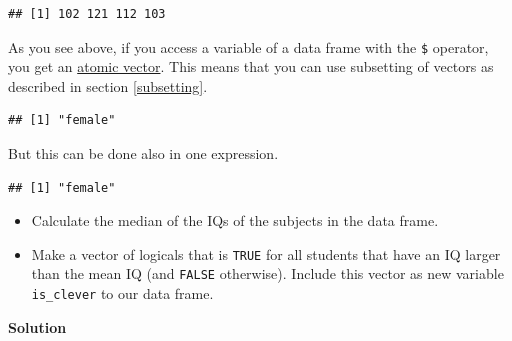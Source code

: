 \documentclass[
]{scrartcl}
\makeatletter
\newenvironment{Shaded}{\begin{snugshade}}{\end{snugshade}}
\newcommand{\CommentTok}[1]{\textcolor[rgb]{0.56,0.35,0.01}{\textit{#1}}}
\newcommand{\DecValTok}[1]{\textcolor[rgb]{0.00,0.00,0.81}{#1}}
\newcommand{\NormalTok}[1]{#1}
\newcommand{\OtherTok}[1]{\textcolor[rgb]{0.56,0.35,0.01}{#1}}
\newcommand{\SpecialCharTok}[1]{\textcolor[rgb]{0.81,0.36,0.00}{\textbf{#1}}}
\providecommand{\tightlist}{%
  \setlength{\itemsep}{0pt}\setlength{\parskip}{0pt}}
\newenvironment{kframe}{%
\medskip{}
\setlength{\fboxsep}{.8em}
 \def\at@end@of@kframe{}%
 \ifinner\ifhmode%
  \def\at@end@of@kframe{\end{minipage}}%
  \begin{minipage}{\columnwidth}%
 \fi\fi%
 \def\FrameCommand##1{\hskip\@totalleftmargin \hskip-\fboxsep
 \colorbox{shadecolor}{##1}\hskip-\fboxsep
     \hskip-\linewidth \hskip-\@totalleftmargin \hskip\columnwidth}%
 \MakeFramed {\advance\hsize-\width
   \@totalleftmargin\z@ \linewidth\hsize
   \@setminipage}}%
 {\par\unskip\endMakeFramed%
 \at@end@of@kframe}
\newenvironment{rmdblock}[1]
  {
  \begin{itemize}
  \renewcommand{\labelitemi}{
    \raisebox{-.7\height}[0pt][0pt]{
      {\setkeys{Gin}{width=3em,keepaspectratio}\texttt{[image: images/\#1]}}
    }
  }
  \setlength{\fboxsep}{1em}
  \begin{kframe}
  \item
  }
  {
  \end{kframe}
  \end{itemize}
  }
\newenvironment{myexercise}
    {\begin{rmdblock}{exercise_green}}
    {\end{rmdblock}}
\newenvironment{webexsolution}[1]
    {\par\tiny\textbf{#1}}
    {\par}
\newcommand{\webexhide}[1]{\begin{webexsolution}{#1}}
\makeatother
\begin{document}
\begin{Shaded}
\end{Shaded}

\begin{verbatim}
## [1] 102 121 112 103
\end{verbatim}

As you see above, if you access a variable of a data frame with the \texttt{\$} operator, you get an \hyperref[vectors]{atomic vector}. This means that you can use subsetting of vectors as described in section \ref{subsetting}.

\begin{Shaded}
\end{Shaded}

\begin{verbatim}
## [1] "female"
\end{verbatim}

But this can be done also in one expression.

\begin{Shaded}
\end{Shaded}

\begin{verbatim}
## [1] "female"
\end{verbatim}

\begin{myexercise}
\begin{itemize}
\tightlist
\item
  Calculate the median of the IQs of the subjects in the data frame.
\item
  Make a vector of logicals that is \texttt{TRUE} for all students that
  have an IQ larger than the mean IQ (and \texttt{FALSE} otherwise).
  Include this vector as new variable \texttt{is\_clever} to our data
  frame.
\end{itemize}
\end{myexercise}
\webexhide{Solution}
\end{document}
